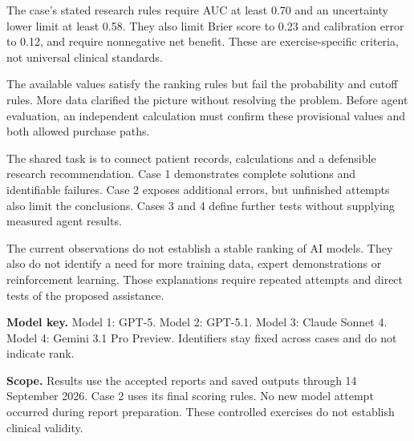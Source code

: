 \documentclass[10pt,a4paper]{article}
\newcommand{\reporthead}[1]{\vspace{2mm}{\normalsize\bfseries #1\par}}
\begin{document}
The case's stated research rules require AUC at least 0.70 and an uncertainty lower limit at least 0.58. They also limit Brier score to 0.23 and calibration error to 0.12, and require nonnegative net benefit. These are exercise-specific criteria, not universal clinical standards.

The available values satisfy the ranking rules but fail the probability and cutoff rules. More data clarified the picture without resolving the problem. Before agent evaluation, an independent calculation must confirm these provisional values and both allowed purchase paths.

\reporthead{What the four cases measure together}
The shared task is to connect patient records, calculations and a defensible research recommendation. Case 1 demonstrates complete solutions and identifiable failures. Case 2 exposes additional errors, but unfinished attempts also limit the conclusions. Cases 3 and 4 define further tests without supplying measured agent results.

The current observations do not establish a stable ranking of AI models. They also do not identify a need for more training data, expert demonstrations or reinforcement learning. Those explanations require repeated attempts and direct tests of the proposed assistance.

\vfill
\begingroup\footnotesize\color{Muted}
\textbf{Model key.} Model 1: GPT-5. Model 2: GPT-5.1. Model 3: Claude Sonnet 4. Model 4: Gemini 3.1 Pro Preview. Identifiers stay fixed across cases and do not indicate rank.
\par\textbf{Scope.} Results use the accepted reports and saved outputs through 14 September 2026. Case 2 uses its final scoring rules. No new model attempt occurred during report preparation. These controlled exercises do not establish clinical validity.
\par\endgroup
\end{document}
